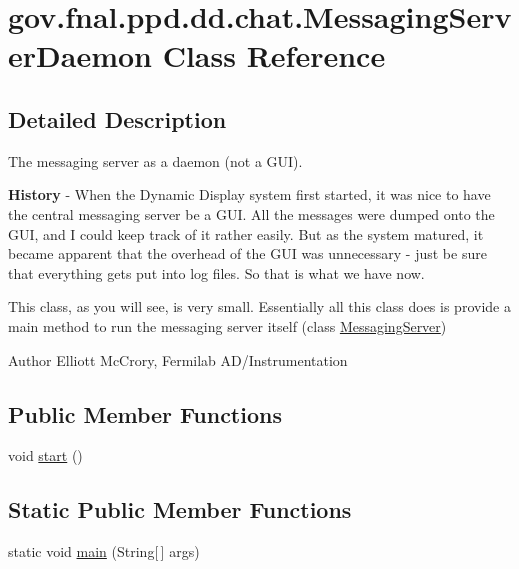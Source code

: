 \hypertarget{classgov_1_1fnal_1_1ppd_1_1dd_1_1chat_1_1MessagingServerDaemon}{\section{gov.\-fnal.\-ppd.\-dd.\-chat.\-Messaging\-Server\-Daemon Class Reference}
\label{classgov_1_1fnal_1_1ppd_1_1dd_1_1chat_1_1MessagingServerDaemon}
}


\subsection{Detailed Description}
The messaging server as a daemon (not a G\-U\-I). 

{\bfseries History} -\/ When the Dynamic Display system first started, it was nice to have the central messaging server be a G\-U\-I. All the messages were dumped onto the G\-U\-I, and I could keep track of it rather easily. But as the system matured, it became apparent that the overhead of the G\-U\-I was unnecessary -\/ just be sure that everything gets put into log files. So that is what we have now. 

This class, as you will see, is very small. Essentially all this class does is provide a main method to run the messaging server itself (class \hyperlink{classgov_1_1fnal_1_1ppd_1_1dd_1_1chat_1_1MessagingServer}{Messaging\-Server})

\begin{DoxyAuthor}{Author}
Elliott Mc\-Crory, Fermilab A\-D/\-Instrumentation 
\end{DoxyAuthor}
\subsection*{Public Member Functions}
\begin{DoxyCompactItemize}
\item 
void \hyperlink{classgov_1_1fnal_1_1ppd_1_1dd_1_1chat_1_1MessagingServerDaemon_a00cbd9c8eec08febc8d4c8baba8bf5fd}{start} ()
\end{DoxyCompactItemize}
\subsection*{Static Public Member Functions}
\begin{DoxyCompactItemize}
\item 
static void \hyperlink{classgov_1_1fnal_1_1ppd_1_1dd_1_1chat_1_1MessagingServerDaemon_a00c5f81d7957dbba0fe6ef52b10d21f0}{main} (String\mbox{[}$\,$\mbox{]} args)
\end{DoxyCompactItemize}


